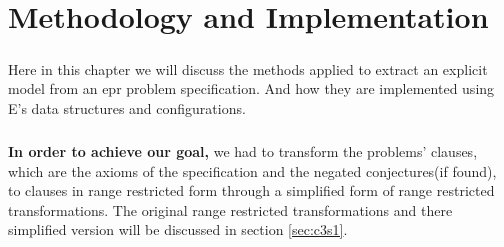 \chapter{Methodology and Implementation}\label{chap:meth_and_impl}

	\paragraph{} 
	Here in this chapter we will discuss the methods applied to extract an explicit model from an \ac{epr} problem specification. And how they are implemented using E's data structures and configurations.

	\paragraph{} 
	\textbf{In order to achieve our goal,} we had to transform the problems' clauses, which are the axioms of the specification and the negated conjectures(if found), to clauses in range restricted form through a simplified form of range restricted transformations. The original range restricted transformations and there simplified version will be discussed in section \ref{sec:c3s1}.  

	
	
	